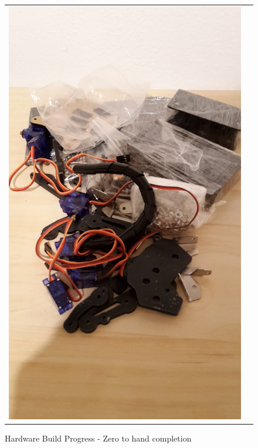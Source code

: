 \documentclass[progress]{cmpreport}
\begin{document}
\begin{figure}[H]
	\centering
	\caption{Hardware Build Progress - Zero to hand completion }
	\begin{tabular}{ll}
		\includegraphics[trim=2cm 2cm 3cm 4cm, clip=true, totalheight=0.15\textheight, angle=0]{photos/Day 1.jpg}
		&

\end{tabular}
\end{figure}
\end{document}
